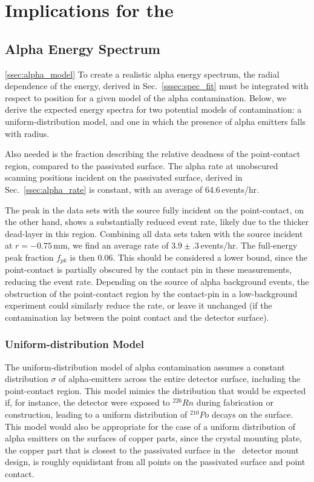 \documentclass[groupedaddress,rmp,amsmath,amssymb,bibnotes,altaffilletter,twocolumn]{revtex4-1}
\begin{document}
\section{Implications for the \MJ\ \DEM\ }
\subsection{Alpha Energy Spectrum}\ref{ssec:alpha_model}
To create a realistic alpha energy spectrum, the radial dependence of the energy, derived in Sec.~\ref{sssec:spec_fit} must be integrated with respect to position for a given model of the alpha contamination. Below, we derive the expected energy spectra for two potential models of contamination: a uniform-distribution model, and one in which the presence of alpha emitters falls with radius.  

Also needed is the fraction describing the relative deadness of the point-contact region, compared to the passivated surface. The alpha rate at unobscured scanning positions incident on the passivated surface, derived in Sec.~\ref{ssec:alpha_rate} is constant, with an average of 64.6\,events/hr. 

The peak in the data sets with the source fully incident on the point-contact, on the other hand, shows a substantially reduced event rate, likely due to the thicker dead-layer in this region. Combining all data sets taken with the source incident at $r=-0.75$\,mm, we find an average rate of $3.9\pm.3$\,events/hr. The full-energy peak fraction $f_{pk}$ is then 0.06. This should be considered a lower bound, since the point-contact is partially obscured by the contact pin in these measurements, reducing the event rate. Depending on the source of alpha background events, the obstruction of the point-contact region by the contact-pin in a low-background experiment could similarly reduce the rate, or leave it unchanged (if the contamination lay between the point contact and the detector surface). 

\subsubsection{Uniform-distribution Model}
The uniform-distribution model of alpha contamination assumes a constant distribution $\sigma$ of alpha-emitters across the entire detector surface, including the point-contact region. This model mimics the distribution that would be expected if, for instance, the detector were exposed to $^{226}Rn$ during fabrication or construction, leading to a uniform distribution of $^{210}Po$ decays on the surface. This model would also be appropriate for the case of a uniform distribution of alpha emitters on the surfaces of copper parts, since the crystal mounting plate, the copper part that is closest to the passivated surface in the \MJ\ detector mount design, is roughly equidistant from all points on the passivated surface and point contact. 
\end{document}
